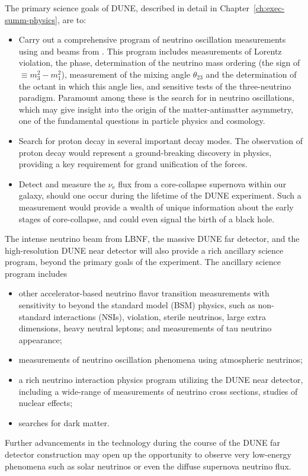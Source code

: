 The primary science goals of DUNE, described in detail in Chapter~\ref{ch:exec-summ-physics}, are to: 
\begin{itemize}

\item Carry out a comprehensive program of neutrino oscillation measurements using \numu and \anumu beams from \fnal. This program includes measurements of Lorentz violation, the   phase, determination of the neutrino mass ordering (the sign of $ \equiv m_3^2-m_1^2$), measurement of the mixing angle $\theta_{23}$ and the determination of the octant in which this angle lies,
and sensitive tests of the three-neutrino paradigm. Paramount among these is the search for  in neutrino oscillations, which may give insight into the origin of the matter-antimatter asymmetry, one of the fundamental questions in particle physics and cosmology. 

\item Search for proton decay in several important decay modes. The observation of proton decay would represent a ground-breaking discovery in physics, providing a key requirement for grand unification of the forces. 

    \item Detect and measure the $\nu_\text{e}$ flux from a core-collapse supernova within our galaxy, should one occur during the lifetime of the DUNE experiment. Such a measurement would provide a wealth of unique information about the early stages of core-collapse, and could even signal the birth of a black hole.
    
\end{itemize}

The intense neutrino beam from LBNF, the massive DUNE \lartpc far detector, and the high-resolution
DUNE near detector will also provide a rich ancillary science program, beyond the primary goals of the experiment. The ancillary science program includes
\begin{itemize}
     \item other accelerator-based neutrino flavor transition measurements with sensitivity to beyond the standard model (BSM) physics, such as non-standard interactions (NSIs),  violation, sterile neutrinos, large extra dimensions, heavy neutral leptons;
 and measurements of tau neutrino appearance;
     \item measurements of neutrino oscillation phenomena using atmospheric neutrinos;
     \item a rich neutrino interaction physics program utilizing the DUNE near detector, including a wide-range of measurements of neutrino cross sections, studies of nuclear effects; %
     \item  searches for dark matter.
\end{itemize} 
Further advancements in the \lartpc %
technology during the course of the DUNE far detector construction may open up the opportunity
to observe very low-energy phenomena such as solar neutrinos or even the diffuse supernova neutrino flux.


